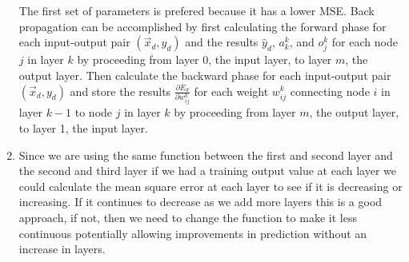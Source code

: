 \documentclass[main.tex]{subfiles}
\begin{document}
\begin{enumerate}
        The first set of parameters is prefered because it has a lower MSE. Back propagation can be accomplished by first calculating the forward phase for each input-output pair $\left(\vec{x}_{d}, y_{d}\right)$ and the results $\hat{y}_d$, $a_k^k$, and $o_{j}^{k}$ for each node $j$ in layer $k$ by proceeding from layer 0, the input layer, to layer $m$, the output layer. Then calculate the backward phase for each  input-output pair $\left(\vec{x}_{d}, y_{d}\right)$ and store the results $\frac{\partial E_{d}}{\partial w_{i j}^{k}}$ for each weight $w_{ij}^{k}$ connecting node $i$ in layer $k-1$ to node $j$ in layer $k$ by proceeding from layer $m$, the output layer, to layer 1, the input layer.
        
        \item Since we are using the same function between the first and second layer and the second and third layer if we had a training output value at each layer we could calculate the mean square error at each layer to see if it is decreasing or increasing. If it continues to decrease as we add more layers this is a good approach, if not, then we need to change the function to make it less continuous potentially allowing improvements in prediction without an increase in layers.
    \end{enumerate}
\end{document}
